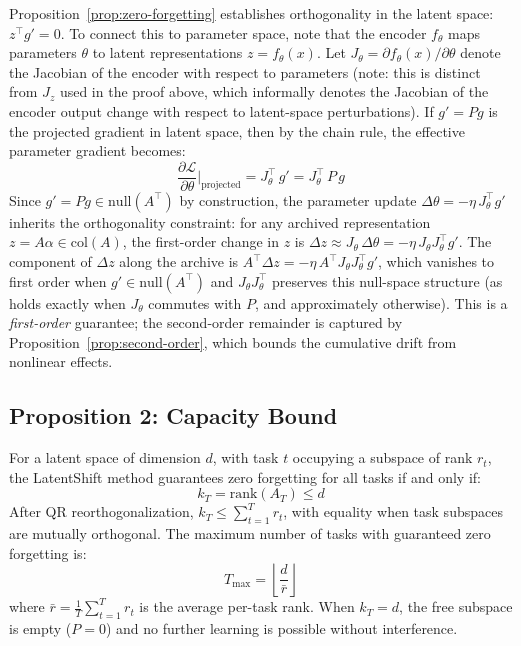 \begin{remark}
\label{rem:latent-to-parameter}
Proposition~\ref{prop:zero-forgetting} establishes orthogonality in the
latent space: $z^\top g' = 0$. To connect this to parameter space, note
that the encoder $f_\theta$ maps parameters $\theta$ to latent
representations $z = f_\theta(x)$. Let $J_\theta = \partial f_\theta(x) /
\partial \theta$ denote the Jacobian of the encoder with respect to
parameters (note: this is distinct from $J_z$ used in the proof above,
which informally denotes the Jacobian of the encoder output change with
respect to latent-space perturbations). If $g' = Pg$ is the projected
gradient in latent space, then by the chain rule, the effective parameter
gradient becomes:
\begin{equation}
    \frac{\partial \mathcal{L}}{\partial \theta}\bigg|_{\text{projected}}
    = J_\theta^\top \, g'
    = J_\theta^\top \, P \, g
    \label{eq:latent-to-param}
\end{equation}
Since $g' = Pg \in \mathrm{null}(A^\top)$ by construction, the parameter
update $\Delta \theta = -\eta \, J_\theta^\top g'$ inherits the
orthogonality constraint: for any archived representation
$z = A\alpha \in \mathrm{col}(A)$, the first-order change in $z$ is
$\Delta z \approx J_\theta \, \Delta \theta = -\eta \, J_\theta J_\theta^\top g'$.
The component of $\Delta z$ along the archive is
$A^\top \Delta z = -\eta \, A^\top J_\theta J_\theta^\top g'$, which
vanishes to first order when $g' \in \mathrm{null}(A^\top)$ and
$J_\theta J_\theta^\top$ preserves this null-space structure (as holds
exactly when $J_\theta$ commutes with $P$, and approximately otherwise).
This is a \emph{first-order} guarantee; the second-order remainder is
captured by Proposition~\ref{prop:second-order}, which bounds the
cumulative drift from nonlinear effects.
\end{remark}

\subsection{Proposition 2: Capacity Bound}

\begin{proposition}
\label{prop:capacity}
For a latent space of dimension $d$, with task $t$ occupying a subspace
of rank $r_t$, the LatentShift method guarantees zero forgetting for all
tasks if and only if:
\begin{equation}
    k_T = \mathrm{rank}(A_T) \leq d
\end{equation}
After QR reorthogonalization, $k_T \leq \sum_{t=1}^T r_t$, with equality
when task subspaces are mutually orthogonal. The maximum number of tasks
with guaranteed zero forgetting is:
\begin{equation}
    T_{\max} = \left\lfloor \frac{d}{\bar{r}} \right\rfloor
\end{equation}
where $\bar{r} = \frac{1}{T}\sum_{t=1}^T r_t$ is the average per-task rank.
When $k_T = d$, the free subspace is empty ($P = 0$) and no further
learning is possible without interference.
\end{proposition}

